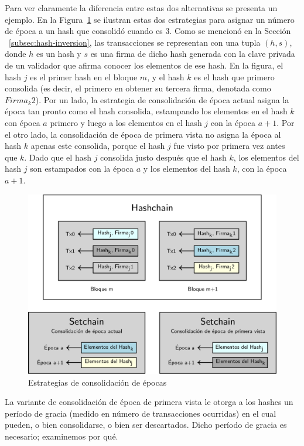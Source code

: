 %
Para ver claramente la diferencia entre estas dos alternativas se presenta un ejemplo.
%
En la Figura~\ref{fig:consolidation_epoch} se ilustran estas dos estrategias para asignar
un número de época a un hash que consolidó cuando \SPH es 3.
%
Como se mencionó en la Sección ~\ref{subsec:hash-inversion}, las transacciones se representan
con una tupla $(h, s)$, donde $h$ es un hash y $s$ es una firma de dicho hash generada con la
clave privada de un validador que afirma conocer los elementos de ese hash.
%
En la figura, el hash $j$ es el primer hash en el bloque $m$, y el hash $k$ es el hash que primero consolida
(es decir, el primero en obtener su tercera firma, denotada como $Firma_{k}2$).
%
Por un lado, la estrategia de consolidación de época actual asigna la época tan pronto como
el hash consolida, estampando los elementos en el hash $k$ con época $a$ primero y luego
a los elementos en el hash $j$ con la época $a+1$.
%
Por el otro lado, la consolidación de época de primera vista no asigna la época al hash $k$
apenas este consolida, porque el hash $j$ fue visto por primera vez antes que $k$.
%
Dado que el hash $j$ consolida justo después que el hash $k$, los elementos del hash $j$ son
estampados
con la época $a$ y los elementos del hash $k$, con la época $a+1$. 

\begin{figure}
  \centering
  \includegraphics[scale=0.28]{figures/consolidation-example.png}
  \caption{Estrategias de consolidación de épocas}
  \label{fig:consolidation_epoch}
\end{figure}

La variante de consolidación de época de primera vista le otorga a los hashes un período
de gracia (medido en número de transacciones ocurridas) en el cual pueden, o bien
consolidarse, o bien ser descartados.
%
Dicho período de gracia es necesario; examinemos por qué.


